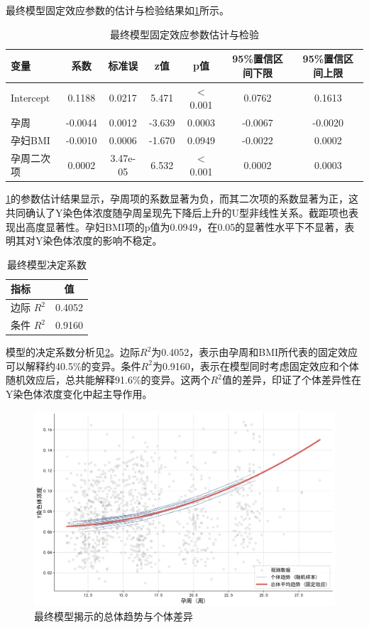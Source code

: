 最终模型固定效应参数的估计与检验结果如\cref{tab:fixed_effects}所示。

\begin{table}[h!]
\centering
\small
\caption{最终模型固定效应参数估计与检验}
\label{tab:fixed_effects}
\begin{tabular}{lcccccc}
\hline
变量 & 系数 & 标准误 & z值 & p值 & 95\%置信区间下限 & 95\%置信区间上限 \\
\hline
Intercept & 0.1188 & 0.0217 & 5.471 & $<$0.001 & 0.0762 & 0.1613 \\
孕周 & -0.0044 & 0.0012 & -3.639 & 0.0003 & -0.0067 & -0.0020 \\
孕妇BMI & -0.0010 & 0.0006 & -1.670 & 0.0949 & -0.0022 & 0.0002 \\
孕周二次项 & 0.0002 & 3.47e-05 & 6.532 & $<$0.001 & 0.0002 & 0.0003 \\
\hline
\end{tabular}
\end{table}

\cref{tab:fixed_effects}的参数估计结果显示，孕周项的系数显著为负，而其二次项的系数显著为正，这共同确认了Y染色体浓度随孕周呈现先下降后上升的U型非线性关系。截距项也表现出高度显著性。孕妇BMI项的p值为0.0949，在0.05的显著性水平下不显著，表明其对Y染色体浓度的影响不稳定。

\begin{table}[h!]
\centering
\caption{最终模型决定系数}
\label{tab:r_squared}
\begin{tabular}{lc}
\hline
指标 & 值 \\
\hline
边际 $R^2$ & 0.4052 \\
条件 $R^2$ & 0.9160 \\
\hline
\end{tabular}
\end{table}

模型的决定系数分析见\cref{tab:r_squared}。边际$R^2$为0.4052，表示由孕周和BMI所代表的固定效应可以解释约40.5\%的变异。条件$R^2$为0.9160，表示在模型同时考虑固定效应和个体随机效应后，总共能解释91.6\%的变异。这两个$R^2$值的差异，印证了个体差异性在Y染色体浓度变化中起主导作用。

\begin{figure}[h!]
\centering
\includegraphics[width=\textwidth]{figs/3问题一/最终模型M4_可视化.png}
\caption{最终模型揭示的总体趋势与个体差异}
\label{fig:final_model_viz}
\end{figure}

